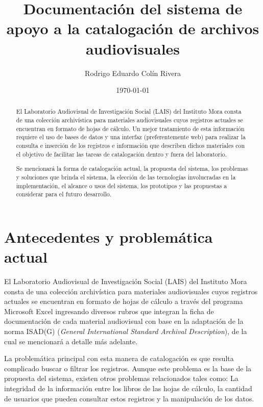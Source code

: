 \documentclass[10pt,letterpaper]{article}
\begin{document}
\title{Documentación del sistema de apoyo a la catalogación de archivos audiovisuales}
\author{Rodrigo Eduardo Colín Rivera}
\date{\today}
\maketitle

\setcounter{secnumdepth}{0} %
\setcounter{tocdepth}{0} %
\graphicspath{{Diagramas/}} %

\begin{abstract}
El Laboratorio Audiovisual de Investigación Social (LAIS) del Instituto Mora consta de una colección archivística para materiales audiovisuales cuyos registros actuales se encuentran en formato de hojas de cálculo. Un mejor tratamiento de esta información requiere el uso de bases de datos y una interfaz (preferentemente web) para realizar la consulta e inserción de los registros e información que describen dichos materiales con el objetivo de facilitar las tareas de catalogación dentro y fuera del laboratorio.

Se mencionará la forma de catalogación actual, la propuesta del sistema, los problemas y soluciones que brinda el sistema, la elección de las tecnologías involucradas en la implementación, el alcance o usos del sistema, los prototipos y las propuestas a considerar para el futuro desarrollo.
\end{abstract}

\section{Antecedentes y problemática actual}
El Laboratorio Audiovisual de Investigación Social (LAIS) del Instituto Mora consta de una colección archivística para materiales audiovisuales cuyos registros actuales se encuentran en formato de hojas de cálculo a través del programa Microsoft Excel ingresando diversos rubros que integran la ficha de documentación de cada material audiovisual con base en la adaptación de la norma ISAD(G) (\textit{General International Standard Archival Description}), de la cual se mencionará a detalle más adelante.

La problemática principal con esta manera de catalogación es que resulta complicado buscar o filtrar los registros. Aunque este problema es la base de la propuesta del sistema, existen otros problemas relacionados tales como: La integridad de la información entre los libros de las hojas de cálculo, la cantidad de usuarios que pueden consultar estos registros y la manipulación de los datos.
\end{document}
